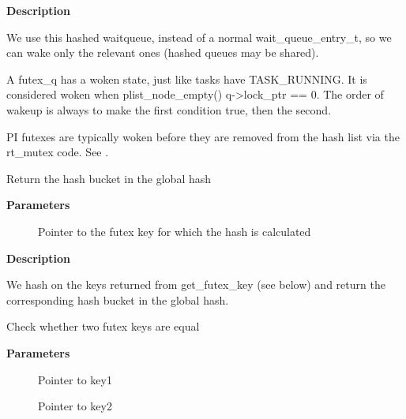 \documentclass[a4paper,8pt,english]{sphinxmanual}
\begin{document}
\textbf{Description}

We use this hashed waitqueue, instead of a normal wait\_queue\_entry\_t, so
we can wake only the relevant ones (hashed queues may be shared).

A futex\_q has a woken state, just like tasks have TASK\_RUNNING.
It is considered woken when plist\_node\_empty() \textbar{}\textbar{} q-\textgreater{}lock\_ptr == 0.
The order of wakeup is always to make the first condition true, then
the second.

PI futexes are typically woken before they are removed from the hash list via
the rt\_mutex code. See .

\begin{fulllineitems}
\label{kernel-hacking/locking:c.hash_futex}
Return the hash bucket in the global hash

\end{fulllineitems}


\textbf{Parameters}
\begin{description}
\item[{}] \leavevmode
Pointer to the futex key for which the hash is calculated

\end{description}

\textbf{Description}

We hash on the keys returned from get\_futex\_key (see below) and return the
corresponding hash bucket in the global hash.

\begin{fulllineitems}
\label{kernel-hacking/locking:c.match_futex}
Check whether two futex keys are equal

\end{fulllineitems}


\textbf{Parameters}
\begin{description}
\item[{}] \leavevmode
Pointer to key1

\item[{}] \leavevmode
Pointer to key2

\end{description}
\end{document}
